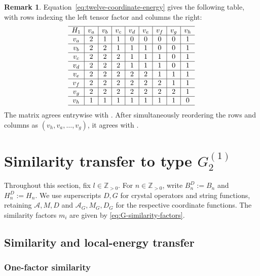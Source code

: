 \documentclass[11pt,reqno]{amsart}
\newcommand{\Z}{\mathbb Z}
\numberwithin{table}{section}
\numberwithin{equation}{section}
\theoremstyle{plain}
\theoremstyle{definition}
\newtheorem{remark}[theorem]{Remark}
\begin{document}
\begin{remark}
	Equation~\eqref{eq:twelve-coordinate-energy} gives the following
	table, with rows indexing the left tensor factor and columns
	the right:
	\begin{equation}\label{eq:H1}
		\begin{array}{c|c|c|c|c|c|c|c|c}\hline
			H_1&v_a&v_b&v_c&v_d&v_e&v_f&v_g&v_h\\ \hline
			v_a&2&1&1&0&0&0&0&1\\ \hline
			v_b&2&2&1&1&1&0&0&1\\ \hline
			v_c&2&2&2&1&1&1&0&1\\ \hline
			v_d&2&2&2&1&1&1&0&1\\ \hline
			v_e&2&2&2&2&2&1&1&1\\ \hline
			v_f&2&2&2&2&2&2&1&1\\ \hline
			v_g&2&2&2&2&2&2&2&1\\ \hline
			v_h&1&1&1&1&1&1&1&0\\ \hline
		\end{array}
	\end{equation}
	The matrix agrees entrywise with \cite[Figure~6]{Dombos}.
	After simultaneously reordering the rows and columns as
	\((v_h,v_a,\ldots,v_g)\), it agrees with \cite[(3.3)]{FHKS}.
\end{remark}

\section{\texorpdfstring{Similarity transfer to type $G_2^{(1)}$}
	{Similarity transfer to type G2(1)}}
\label{sec:G21-similarity-transfer}

Throughout this section, fix \(l\in\Z_{>0}\).
For \(n\in\Z_{>0}\), write \(B_n^D:=B_n\) and \(H_n^D:=H_n\).
We use superscripts \(D,G\) for crystal operators and string
functions, retaining \(\mathcal A,M,D\) and
\(\mathcal A_G,M_G,D_G\) for the respective coordinate functions.
The similarity factors \(m_i\) are given by
\eqref{eq:G-similarity-factors}.

\subsection{Similarity and local-energy transfer}

\subsubsection{One-factor similarity}
\end{document}
